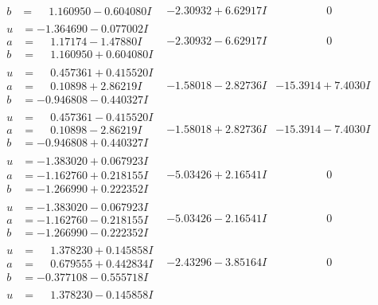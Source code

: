 \documentclass[1p]{elsarticle_modified}
\theoremstyle{definition}
\begin{document}
$$\begin{array}{c|c|c}
\begin{aligned}
b &= \phantom{-}1.160950 - 0.604080 I\end{aligned}
 & -2.30932 + 6.62917 I & \phantom{-0.000000 } 0 \\ \hline\begin{aligned}
u &= -1.364690 - 0.077002 I \\
a &= \phantom{-}1.17174 - 1.47880 I \\
b &= \phantom{-}1.160950 + 0.604080 I\end{aligned}
 & -2.30932 - 6.62917 I & \phantom{-0.000000 } 0 \\ \hline\begin{aligned}
u &= \phantom{-}0.457361 + 0.415520 I \\
a &= \phantom{-}0.10898 + 2.86219 I \\
b &= -0.946808 - 0.440327 I\end{aligned}
 & -1.58018 - 2.82736 I & -15.3914 + 7.4030 I \\ \hline\begin{aligned}
u &= \phantom{-}0.457361 - 0.415520 I \\
a &= \phantom{-}0.10898 - 2.86219 I \\
b &= -0.946808 + 0.440327 I\end{aligned}
 & -1.58018 + 2.82736 I & -15.3914 - 7.4030 I \\ \hline\begin{aligned}
u &= -1.383020 + 0.067923 I \\
a &= -1.162760 + 0.218155 I \\
b &= -1.266990 + 0.222352 I\end{aligned}
 & -5.03426 + 2.16541 I & \phantom{-0.000000 } 0 \\ \hline\begin{aligned}
u &= -1.383020 - 0.067923 I \\
a &= -1.162760 - 0.218155 I \\
b &= -1.266990 - 0.222352 I\end{aligned}
 & -5.03426 - 2.16541 I & \phantom{-0.000000 } 0 \\ \hline\begin{aligned}
u &= \phantom{-}1.378230 + 0.145858 I \\
a &= \phantom{-}0.679555 + 0.442834 I \\
b &= -0.377108 - 0.555718 I\end{aligned}
 & -2.43296 - 3.85164 I & \phantom{-0.000000 } 0 \\ \hline\begin{aligned}
u &= \phantom{-}1.378230 - 0.145858 I \\

\end{aligned}
\end{array}$$
\end{document}
